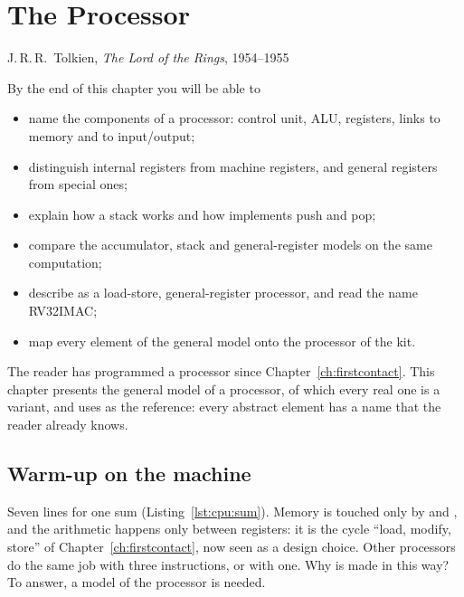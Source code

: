 \chapter{The Processor}
\label{ch:processor}

  {J.\,R.\,R.\ Tolkien, \emph{The Lord of the Rings}, 1954--1955}

\begin{chapgoals}
By the end of this chapter you will be able to
\begin{itemize}
\item name the components of a processor: control unit, ALU, registers, links to memory and to input/output;
\item distinguish internal registers from machine registers, and general registers from special ones;
\item explain how a stack works and how \riscv implements push and pop;
\item compare the accumulator, stack and general-register models on the same computation;
\item describe \riscv as a load-store, general-register processor, and read the name RV32IMAC;
\item map every element of the general model onto the processor of the \prg kit.
\end{itemize}
\end{chapgoals}


The reader has programmed a processor since Chapter~\ref{ch:firstcontact}.
This chapter presents the general model of a processor, of which every real
one is a variant, and uses \riscv as the reference: every abstract element
has a name that the reader already knows.

\section{Warm-up on the machine}


Seven lines for one sum (Listing~\ref{lst:cpu:sum}). Memory is touched only
by  and , and the arithmetic happens only between registers:
it is the cycle ``load, modify, store'' of Chapter~\ref{ch:firstcontact}, now
seen as a design choice. Other processors do the same job with three
instructions, or with one. Why is \riscv made in this way? To answer, a
model of the processor is needed.

